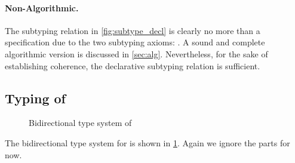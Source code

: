 \paragraph{Non-Algorithmic.}
The subtyping relation in \cref{fig:subtype_decl} is clearly no more than a
specification due to the two subtyping axioms: . A sound
and complete algorithmic version is discussed in \cref{sec:alg}. Nevertheless,
for the sake of establishing coherence, the declarative subtyping relation is
sufficient.


\subsection{Typing of \namee}


\begin{figure}[t]
  \centering
{}
  \caption{Bidirectional type system of \namee}
  \label{fig:type_system}
\end{figure}

\renewcommand{\rulehl}[1]{#1}



The bidirectional type system for \namee is shown in \cref{fig:type_system}.
Again we ignore the  parts for now.


\begin{comment}
Unlike the development of \oname, which first presents a type assignment
specification, \Cref{fig:type_system} directly present the bidirectional type
system of \namee.
Unfortunately, we found that their declarative type
system is incoherent in nature (even with all the syntactic restrictions).
\jeremy{perhaps add a counter example somewhere?} Again, the reader is advised
to continue ignoring the gray-shaded parts until \cref{sec:elaboration}.
\tom{The above story is a bit confusing to me. Is it the case that the
     \oname paper already was aware of the coherence problem with its
     declarative type system and for that reason (and inference) presented
     a bidirection type system as well? If so, that's not clear.} \jeremy{I
     remember at one point Bruno and I believed the declarative system is
     coherent, it's just hard to prove. Then I found a counterexample. That was
     after \tname paper.  }
\end{comment}


